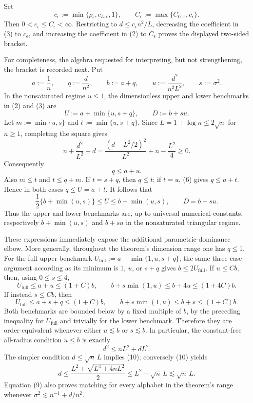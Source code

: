 Set
\[
 c_{\epsilon}:=\min\{\rho_{\epsilon},c_{L,\epsilon},1\},
 \qquad
 C_{\epsilon}:=\max\{C_{U,\epsilon},c_{\epsilon}\}.
\]
Then \(0<c_{\epsilon}\leq C_{\epsilon}<\infty\).  Restricting to \(d\leq c_{\epsilon}n^2/L\), decreasing the coefficient in (3) to \(c_{\epsilon}\), and increasing the coefficient in (2) to \(C_{\epsilon}\) proves the displayed two-sided bracket.

For completeness, the algebra requested for interpreting, but not strengthening, the bracket is recorded next.  Put
\[
 a:=\frac1n,
 \qquad q:=\frac d{n^2},
 \qquad b:=a+q,
 \qquad u:=\frac{d^2}{n^2L^2},
 \qquad s:=\sigma^2.
 \tag{4}
\]
In the nonsaturated regime \(u\leq1\), the dimensionless upper and lower benchmarks in (2) and (3) are
\[
 U:=a+\min\{u,s+q\},
 \qquad
 D:=b+su.
 \tag{5}
\]
Let \(m:=\min\{u,s\}\) and \(t:=\min\{u,s+q\}\).  Since \(L=1+\log n\leq2\sqrt n\) for \(n\geq1\), completing the square gives
\[
 n+\frac{d^2}{L^2}-d
 =\frac{(d-L^2/2)^2}{L^2}+n-\frac{L^2}{4}
 \geq0.
\]
Consequently
\[
 q\leq a+u.
 \tag{6}
\]
Also \(m\leq t\) and \(t\leq q+m\).  If \(t=s+q\), then \(q\leq t\); if \(t=u\), (6) gives \(q\leq a+t\).  Hence in both cases \(q\leq U=a+t\).  It follows that
\[
 \frac12\{b+\min(u,s)\}
 \leq U
 \leq b+\min(u,s),
 \qquad
 D=b+su.
 \tag{7}
\]
Thus the upper and lower benchmarks are, up to universal numerical constants, respectively \(b+\min(u,s)\) and \(b+su\) in the nonsaturated triangular regime.

These expressions immediately expose the additional parametric-dominance elbow.  More generally, throughout the theorem's dimension range one has \(q\leq1\).  For the full upper benchmark \(U_{\mathrm{full}}:=a+\min\{1,u,s+q\}\), the same three-case argument according as its minimum is \(1\), \(u\), or \(s+q\) gives \(b\leq2U_{\mathrm{full}}\).  If \(u\leq Cb\), then, using \(0\leq s\leq4\),
\[
 U_{\mathrm{full}}\leq a+u\leq(1+C)b,
 \qquad
 b+s\min(1,u)\leq b+4u\leq(1+4C)b.
 \tag{8}
\]
If instead \(s\leq Cb\), then
\[
 U_{\mathrm{full}}\leq a+s+q\leq(1+C)b,
 \qquad
 b+s\min(1,u)\leq b+s\leq(1+C)b.
 \tag{9}
\]
Both benchmarks are bounded below by a fixed multiple of \(b\), by the preceding inequality for \(U_{\mathrm{full}}\) and trivially for the lower benchmark.  Therefore they are order-equivalent whenever either \(u\lesssim b\) or \(s\lesssim b\).  In particular, the constant-free all-radius condition \(u\leq b\) is exactly
\[
 d^2\leq nL^2+dL^2.
 \tag{10}
\]
The simpler condition \(d\leq\sqrt n\,L\) implies (10); conversely (10) yields
\[
 d\leq\frac{L^2+\sqrt{L^4+4nL^2}}2
 \leq L^2+\sqrt n\,L
 \lesssim\sqrt n\,L.
\]
Equation (9) also proves matching for every alphabet in the theorem's range whenever \(\sigma^2\lesssim n^{-1}+d/n^2\).

